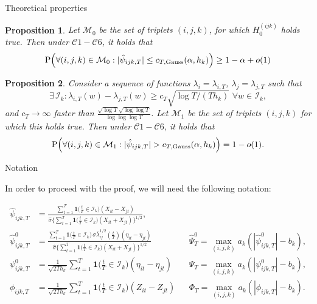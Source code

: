 \documentclass[10pt, handout]{beamer}
\newcommand{\Prob}{\mathrm{P}}
\newtheorem{prop}{Proposition}
\newcommand{\ind}{\boldsymbol{1}\Big( \frac{t}{T} \in \mathcal{I}_k \Big)} %
\newcommand{\indsmall}{\boldsymbol{1}\big( \frac{t}{T} \in \mathcal{I}_k \big)} %
\begin{document}
\begin{frame}{Theoretical properties}
\begin{prop}\label{prop1}
Let $\mathcal{M}_0$ be the set of triplets $(i, j, k)$, for which $H_0^{(ijk)}$ holds true. Then under $\mathcal{C}1 - \mathcal{C}6$, it holds that 
\vspace{-2mm}
\begin{align*}
 \Prob\Big( \forall (i,j,k) \in \mathcal{M}_0: |\hat{\psi}_{ijk,T}| \le c_{T,\textnormal{Gauss}}(\alpha,h_k) \Big) \ge 1 - \alpha + o(1)
\end{align*}
\end{prop}\pause
\begin{prop}\label{prop2}
Consider a sequence of functions $\lambda_{i} = \lambda_{i,T}$, $\lambda_{j} = \lambda_{j, T}$ such that $$\exists \, \mathcal{I}_{k}:  \lambda_{i, T}(w) - \lambda_{j, T}(w) \ge c_T \sqrt{\log T / (T h_{k})} \,\, \forall w \in \mathcal{I}_{k},$$ and $c_T \rightarrow \infty$ faster than $\frac{\sqrt{\log T}\sqrt{\log \log T}}{\log \log \log T}$. Let $\mathcal{M}_1$ be the set of triplets $(i, j, k)$ for which this holds true. Then under $\mathcal{C}1 - \mathcal{C}6$, it holds that
\vspace{-2mm}
\begin{equation*}
\Prob\Big( \forall (i,j,k) \in \mathcal{M}_1: |\hat{\psi}_{ijk,T}| > c_{T,\textnormal{Gauss}}(\alpha,h_k) \Big) = 1 - o(1).
\end{equation*}
\end{prop}
\end{frame}

\begin{frame}{Notation}
\begin{center}
In order to proceed with the proof, we will need the following notation:
\end{center}
\vspace{-2mm}
\begin{align*}
\widehat{\psi}_{ijk, T} &= \frac{\sum\nolimits_{t=1}^T \indsmall (X_{it} -X_{jt})}{\hat{\sigma} \big\{ \sum\nolimits_{t=1}^T \indsmall  (X_{it} + X_{jt} )\big\}^{1/2}}, &&\\
\hat{\psi}_{ijk,T}^0 &= \frac{\sum\nolimits_{t=1}^T \indsmall \, \sigma \overline{\lambda}_{ij}^{1/2}(\frac{t}{T}) (\eta_{it} - \eta_{jt})}{ \hat{\sigma} \{ \sum\nolimits_{t=1}^T \indsmall (X_{it} + X_{jt}) \}^{1/2}} &&\hat{\Psi}_T^0 = \max_{(i,j,k)} a_k (|\hat{\psi}_{ijk,T}^0| - b_k),\\
\psi_{ijk,T}^0 &= \frac{1}{\sqrt{2Th_k}} \sum\limits_{t=1}^T \ind (\eta_{it} - \eta_{jt}) &&\Psi_T = \max_{(i,j,k)} a_k (|\psi_{ijk,T}^0| - b_k),\\
\phi_{ijk,T} &= \frac{1}{\sqrt{2 T h_k}} \sum\limits_{t=1}^T \ind (Z_{it} - Z_{jt}) &&\Phi_T = \max_{(i,j,k)} a_k (|\phi_{ijk,T}| - b_k).
\end{align*}
\end{frame}
\end{document}
